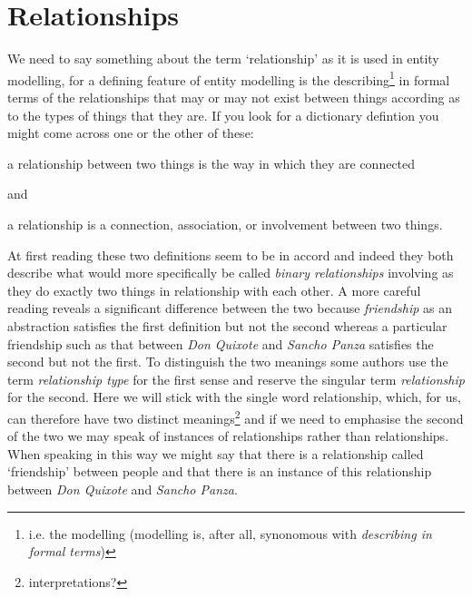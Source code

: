 
\section{Relationships}
\label{Relationships}
\mynote
We need to say something about the term `relationship' as it is used in
entity modelling, for a defining feature of entity modelling is the describing\footnote{i.e. the modelling (modelling is, after all,  synonomous with \textit{describing in formal terms})}
in formal terms  of the relationships that may or may not  exist between things according as to the types of things that they are. 
\mynote 
If you look for a dictionary defintion you might come across one or the other of these:
\begin{erquote}
a relationship between two things is the way in which they are connected
\end{erquote}
and 
\begin{erquote}
a relationship is a connection, association, or involvement between two things.
\end{erquote}

At first reading these two definitions seem to be in accord and indeed 
they both describe what would more specifically be called \textit{binary relationships} involving as they do exactly two things in relationship with each other.
A more careful reading reveals a significant difference between the two because \textit{friendship} as an abstraction satisfies the first definition but not the second whereas a particular friendship such as that between \textit{Don Quixote} and \textit{Sancho Panza} satisfies the second  but not the first. 
To distinguish the two meanings some authors use the term \textit{relationship type} for the first sense and reserve the singular term \textit{relationship}  for the second. Here we will stick with the single word relationship, which, for us, can therefore have two distinct meanings\footnote{interpretations?} and if we need to emphasise the second of the two we may speak of instances of relationships rather than relationships. When speaking in this way we might say that there is a relationship called `friendship' between people and that there is an instance of this relationship between \textit{Don Quixote} and \textit{Sancho Panza}.

